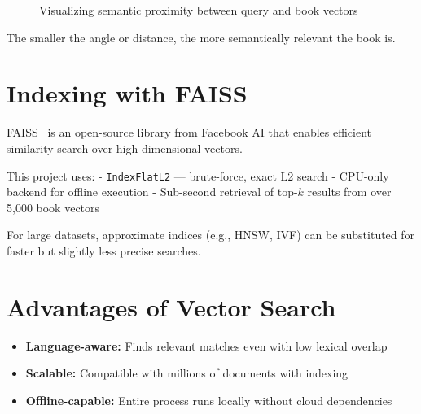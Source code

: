 \begin{figure}[H]
\centering
{}
\caption{Visualizing semantic proximity between query and book vectors}
\end{figure}

The smaller the angle or distance, the more semantically relevant the book is.

\section{Indexing with FAISS}
FAISS~\parencite{johnson2019billion} is an open-source library from Facebook AI that enables efficient similarity search over high-dimensional vectors.

This project uses:
- \texttt{IndexFlatL2} — brute-force, exact L2 search
- CPU-only backend for offline execution
- Sub-second retrieval of top-\( k \) results from over 5,000 book vectors

For large datasets, approximate indices (e.g., HNSW, IVF) can be substituted for faster but slightly less precise searches.

\section{Advantages of Vector Search}
\begin{itemize}
    \item \textbf{Language-aware:} Finds relevant matches even with low lexical overlap
    \item \textbf{Scalable:} Compatible with millions of documents with indexing
    \item \textbf{Offline-capable:} Entire process runs locally without cloud dependencies
\end{itemize}

